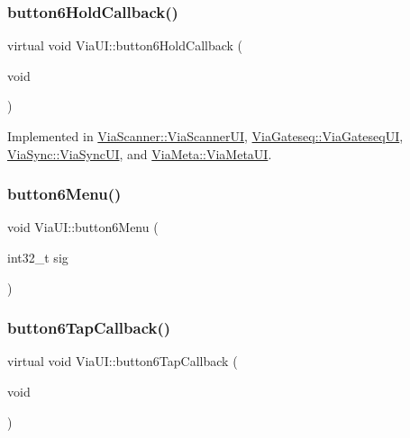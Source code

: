 \mbox{\label{class_via_u_i_afa66f7946b6cf755b94383715b26a651}} 
\subsubsection{\texorpdfstring{button6\+Hold\+Callback()}{button6HoldCallback()}}
{\footnotesize\ttfamily virtual void Via\+U\+I\+::button6\+Hold\+Callback (\begin{DoxyParamCaption}\item[{void}]{ }\end{DoxyParamCaption})\hspace{0.3cm}{\ttfamily [pure virtual]}}



Implemented in \mbox{\hyperlink{class_via_scanner_1_1_via_scanner_u_i_af2cd0e1ac72f9486aa152b1d69bec8c8}{Via\+Scanner\+::\+Via\+Scanner\+UI}}, \mbox{\hyperlink{class_via_gateseq_1_1_via_gateseq_u_i_ae16a0091338c515aa625c8738de1752b}{Via\+Gateseq\+::\+Via\+Gateseq\+UI}}, \mbox{\hyperlink{class_via_sync_1_1_via_sync_u_i_ace582870350424e071fc6ddb87efd802}{Via\+Sync\+::\+Via\+Sync\+UI}}, and \mbox{\hyperlink{class_via_meta_1_1_via_meta_u_i_a793ad6aff954aeefd91a070d1a65c9d1}{Via\+Meta\+::\+Via\+Meta\+UI}}.

\mbox{\label{class_via_u_i_aed3d9b75b2d67b17a5596597aa59cf26}} 
\subsubsection{\texorpdfstring{button6\+Menu()}{button6Menu()}}
{\footnotesize\ttfamily void Via\+U\+I\+::button6\+Menu (\begin{DoxyParamCaption}\item[{int32\+\_\+t}]{sig }\end{DoxyParamCaption})}

\mbox{\label{class_via_u_i_a8a6bf29d336faa8e9d026a84be45d956}} 
\subsubsection{\texorpdfstring{button6\+Tap\+Callback()}{button6TapCallback()}}
{\footnotesize\ttfamily virtual void Via\+U\+I\+::button6\+Tap\+Callback (\begin{DoxyParamCaption}\item[{void}]{ }\end{DoxyParamCaption})\hspace{0.3cm}{\ttfamily [pure virtual]}}



